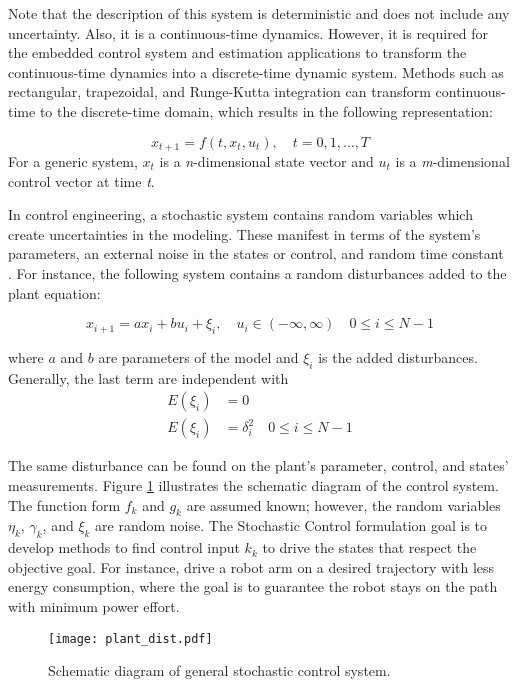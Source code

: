 \documentclass[]{hdsr}
\begin{document}
Note that the description of this system is deterministic and does not include any uncertainty. Also, it is a continuous-time dynamics. However, it is required for the embedded control system and estimation applications to transform the continuous-time dynamics into a discrete-time dynamic system. Methods such as rectangular, trapezoidal, and Runge-Kutta integration \citep{simon2006optimal} can transform continuous-time to the discrete-time domain, which results in the following representation:

\begin{equation}
    x_{t+1}=f\left(t, x_{t}, u_{t}\right), \quad t=0,1, \ldots, T
\end{equation}
For a generic system, $x_t$ is a \textit{n}-dimensional state vector and $u_t$ is a \textit{m}-dimensional control vector at time \textit{t}. 

In control engineering, a stochastic system contains random variables which create uncertainties in the modeling. These manifest in terms of the system's parameters, an external noise in the states or control, and random time constant \citep{aoki1967optimization}. For instance, the following system contains a random disturbances added to the plant equation:

\begin{equation}
    x_{i+1}=ax_i+bu_i+\xi_i, \quad u_i \in (-\infty,\infty) \quad 0 \leqslant i \leqslant N-1 
\end{equation}

where $a$ and $b$ are parameters of the model and $\xi_i$ is the added disturbances. Generally, the last term are independent with 
\begin{equation}
\begin{split}
    E(\xi_i)&=0\\
    E(\xi_i)&=\delta_i^2 \quad 0 \leqslant i \leqslant N-1 
\end{split}
\end{equation}

The same disturbance can be found on the plant's parameter, control, and states' measurements. Figure \ref{fig:gen_plant} illustrates the schematic diagram of the control system. The function form $f_k$ and $g_k$ are assumed known; however, the random variables $\eta_k$, $\gamma_k$, and $\xi_k$ are random noise. The Stochastic Control formulation goal is to develop methods to find control input $k_k$ to drive the states that respect the objective goal. For instance, drive a robot arm on a desired trajectory with less energy consumption, where the goal is to guarantee the robot stays on the path with minimum power effort.
\begin{figure}[H]
    \centering
    \texttt{[image: plant\_dist.pdf]}  \\
    \caption{Schematic diagram of general stochastic control system.}
    \label{fig:gen_plant}
\end{figure}
\end{document}
